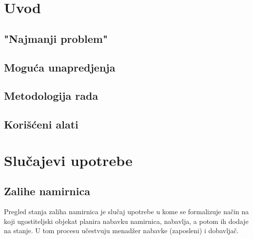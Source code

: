\documentclass{article}
\begin{document}

\section{Uvod}


\subsection{"Najmanji problem"}


\subsection{Moguća unapredjenja}


\subsection{Metodologija rada}


\subsection{Korišćeni alati}


\section{Slučajevi upotrebe}


\subsection{Zalihe namirnica}
Pregled stanja zaliha namirnica je slučaj upotrebe u kome se formalizuje način na koji ugostiteljski objekat planira nabavku namirnica, nabavlja, a potom ih dodaje na stanje. U tom procesu učestvuju menadžer nabavke (zaposleni) i dobavljač. 
\end{document}
